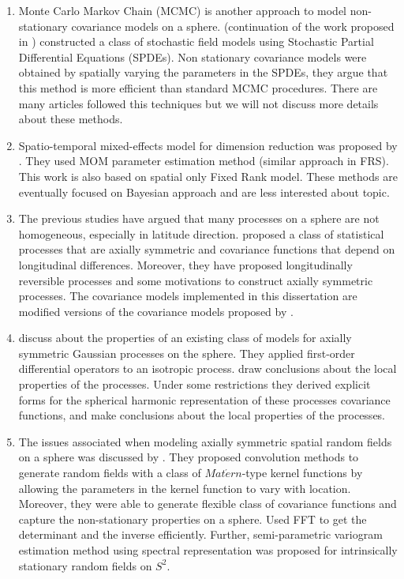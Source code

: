 \begin{enumerate}
\item Monte Carlo Markov Chain (MCMC) is another approach to model non-stationary covariance models on a sphere. \cite{BolinLindgren2011} (continuation of the work proposed in \cite{Lindgren2011} ) constructed a class of stochastic field models using Stochastic Partial Differential Equations (SPDEs). Non stationary covariance models were obtained by spatially varying the parameters in the SPDEs, they argue that this method is more efficient than standard MCMC procedures. There are many articles followed this techniques but we will not discuss more details about these methods.

\item Spatio-temporal mixed-effects model for dimension reduction was proposed by \cite{KatzfussCressie2011}. They used MOM parameter estimation method (similar approach in FRS). This work is also based on \cite{CressieJohannesson2008} spatial only Fixed Rank model. These methods are eventually focused on Bayesian approach and are less interested about topic.

\item The previous studies have argued that many processes on a sphere are not homogeneous, especially in latitude direction. \cite{Huang2012} proposed a class of statistical processes that are axially symmetric and covariance functions that depend on longitudinal differences. Moreover, they have proposed longitudinally reversible processes and some motivations to construct axially symmetric processes. The covariance models implemented in this dissertation are modified versions of the covariance models proposed by \cite{Huang2012}.  

\item \cite{HitczenkoStein2012} discuss about the properties of an existing class of models for axially symmetric Gaussian processes on the sphere. They applied first-order differential operators to an isotropic process. draw conclusions about the local properties of the processes. Under some restrictions they derived explicit forms for the spherical harmonic representation of these processes covariance functions, and make conclusions about the local properties of the processes.

\item The issues associated when modeling axially symmetric spatial random fields on a sphere was discussed by \cite{Li2013}. They proposed convolution methods to generate random fields with a class of $Mat\acute{e}rn$-type kernel functions by allowing the parameters in the kernel function to vary with location. Moreover, they were able to generate flexible class of covariance functions and capture the non-stationary properties on a sphere. Used FFT to get the determinant and the inverse efficiently. Further, semi-parametric variogram estimation method using spectral representation was proposed for intrinsically stationary random fields on $S^2$.     


\end{enumerate}
